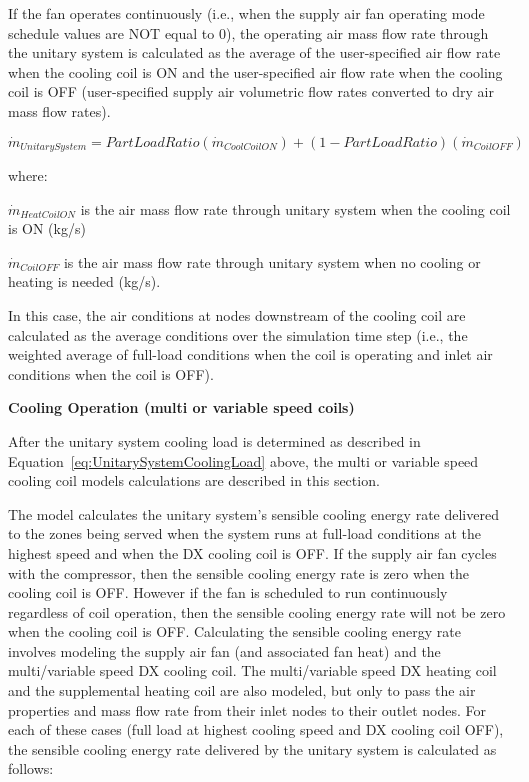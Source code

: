 If the fan operates continuously (i.e., when the supply air fan operating mode schedule values are NOT equal to 0), the operating air mass flow rate through the unitary system is calculated as the average of the user-specified air flow rate when the cooling coil is ON and the user-specified air flow rate when the cooling coil is OFF (user-specified supply air volumetric flow rates converted to dry air mass flow rates).

\begin{equation}
{\dot{m}_{UnitarySystem}} = PartLoadRatio\left( {{\dot{m}_{CoolCoilON}}} \right) + \left( {1 - PartLoadRatio} \right)\left( {{\dot{m}_{CoilOFF}}} \right)
\end{equation}

where:

\(\dot m_{HeatCoilON}\) is the air mass flow rate through unitary system when the cooling coil is ON (kg/s)

\(\dot m_{CoilOFF}\) is the air mass flow rate through unitary system when no cooling or heating is needed (kg/s).

In this case, the air conditions at nodes downstream of the cooling coil are calculated as the average conditions over the simulation time step (i.e., the weighted average of full-load conditions when the coil is operating and inlet air conditions when the coil is OFF).

\textbf{Cooling Operation (multi or variable speed coils)}

After the unitary system cooling load is determined as described in Equation~\ref{eq:UnitarySystemCoolingLoad} above, the multi or variable speed cooling coil models calculations are described in this section.

The model calculates the unitary system's sensible cooling energy rate delivered to the zones being served when the system runs at full-load conditions at the highest speed and when the DX cooling coil is OFF. If the supply air fan cycles with the compressor, then the sensible cooling energy rate is zero when the cooling coil is OFF. However if the fan is scheduled to run continuously regardless of coil operation, then the sensible cooling energy rate will not be zero when the cooling coil is OFF. Calculating the sensible cooling energy rate involves modeling the supply air fan (and associated fan heat) and the multi/variable speed DX cooling coil. The multi/variable speed DX heating coil and the supplemental heating coil are also modeled, but only to pass the air properties and mass flow rate from their inlet nodes to their outlet nodes. For each of these cases (full load at highest cooling speed and DX cooling coil OFF), the sensible cooling energy rate delivered by the unitary system is calculated as follows:

